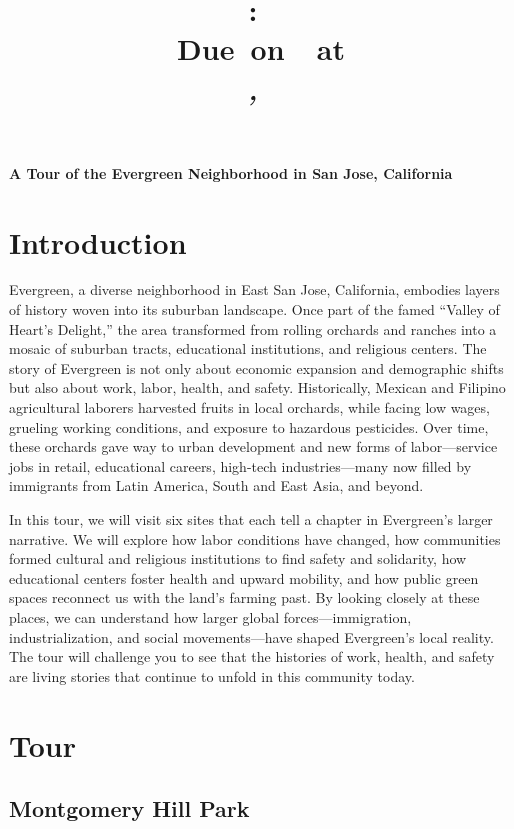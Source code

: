 \documentclass[12pt]{article}
\title{
	\vspace{2in}
	\textmd{\textbf{\hmwkClass:\ \hmwkTitle}}\\
	\normalsize\vspace{0.1in}\small{Due\ on\ \hmwkDueDate\ at \hmwkDueTime}\\
	\vspace{0.1in}\large{\textit{\hmwkClassInstructor,\ \hmwkClassTime}}
	\vspace{3in}
}
\author{\textbf{\hmwkAuthorName}}
\date{\hmwkCompletionDate}
\begin{document}
\maketitle

\pagebreak

\doublespacing

\textbf{\Large A Tour of the Evergreen Neighborhood in San Jose, California}

\section{Introduction}

Evergreen, a diverse neighborhood in East San Jose, California, embodies layers of history woven into its suburban landscape. Once part of the famed “Valley of Heart’s Delight,” the area transformed from rolling orchards and ranches into a mosaic of suburban tracts, educational institutions, and religious centers. The story of Evergreen is not only about economic expansion and demographic shifts but also about work, labor, health, and safety. Historically, Mexican and Filipino agricultural laborers harvested fruits in local orchards, while facing low wages, grueling working conditions, and exposure to hazardous pesticides. Over time, these orchards gave way to urban development and new forms of labor—service jobs in retail, educational careers, high-tech industries—many now filled by immigrants from Latin America, South and East Asia, and beyond.

In this tour, we will visit six sites that each tell a chapter in Evergreen’s larger narrative. We will explore how labor conditions have changed, how communities formed cultural and religious institutions to find safety and solidarity, how educational centers foster health and upward mobility, and how public green spaces reconnect us with the land’s farming past. By looking closely at these places, we can understand how larger global forces—immigration, industrialization, and social movements—have shaped Evergreen’s local reality. The tour will challenge you to see that the histories of work, health, and safety are living stories that continue to unfold in this community today.

\section{Tour}

\subsection{Montgomery Hill Park}
\end{document}
